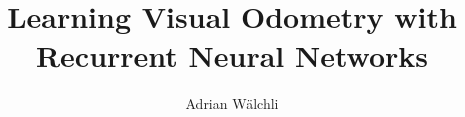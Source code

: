 \documentclass[pdftex,a4paper]{report}
\begin{document}
	\pagestyle{fancyplain} \thispagestyle{empty}
	
	\title{Learning Visual Odometry with Recurrent Neural Networks}
	\author{Adrian W\"alchli}
	
	 \setcounter{page}{1}
	\maketitle
\end{document}
